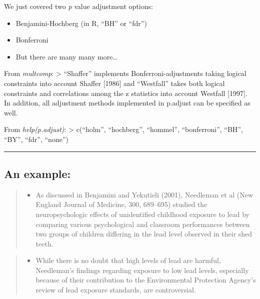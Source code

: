 \documentclass[]{article}
\providecommand{\tightlist}{%
  \setlength{\itemsep}{0pt}\setlength{\parskip}{0pt}}
\begin{document}
We just covered two \emph{p} value adjustment options:

\begin{itemize}
\tightlist
\item
  Benjamini-Hochberg (in R, ``BH'' or ``fdr'')
\item
  Bonferroni
\item
  But there are many many more\ldots{}
\end{itemize}

From \emph{multcomp}: \textgreater{} ``Shaffer'' implements
Bonferroni-adjustments taking logical constraints into account Shaffer
{[}1986{]} and ``Westfall'' takes both logical constraints and
correlations among the z statistics into account Westfall {[}1997{]}. In
addition, all adjustment methods implemented in p.adjust can be
specified as well.

From \emph{help(p.adjust)}: \textgreater{} c(``holm'', ``hochberg'',
``hommel'', ``bonferroni'', ``BH'', ``BY'', ``fdr'', ``none'')

\begin{center}\rule{0.5\linewidth}{\linethickness}\end{center}

\hypertarget{an-example}{%
\subsection{An example:}\label{an-example}}

\begin{quote}
\begin{itemize}
\tightlist
\item
  As discussed in Benjamini and Yekutieli (2001), Needleman et al (New
  England Journal of Medicine, 300, 689--695) studied the
  neuropsychologic effects of unidentified childhood exposure to lead by
  comparing various psychological and classroom performances between two
  groups of children differing in the lead level observed in their shed
  teeth.
\end{itemize}
\end{quote}

\begin{quote}
\begin{itemize}
\tightlist
\item
  While there is no doubt that high levels of lead are harmful,
  Needleman's findings regarding exposure to low lead levels, especially
  because of their contribution to the Environmental Protection Agency's
  review of lead exposure standards, are controversial.
\end{itemize}
\end{quote}
\end{document}
